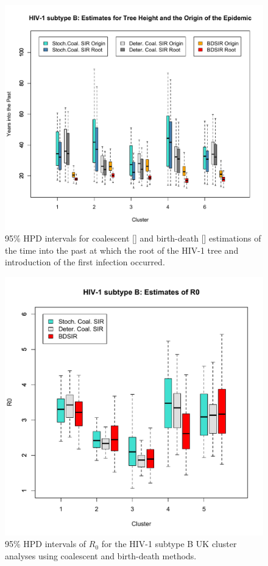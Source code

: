 \documentclass[12pt,titlepage]{article}
\begin{document}
%
\begin{figure}[!ht]
\begin{center}
\includegraphics[width=7in]{HIV1subtypeB_treeHeight_Origin.pdf}
\end{center}
\caption{
95\% HPD intervals for coalescent [\protect\cite{Volz:2012}] and birth-death [\protect\cite{Kuhnert:2014}]
estimations of the time into the past at which the root of the HIV-1 tree and introduction 
of the first infection occurred.}
\label{fig:HIV_HeightandOrigin}
\end{figure}
%
\begin{figure}[!ht]
\begin{center}
\includegraphics[width=7in]{HIV1subtypeB_R0.pdf}
\end{center}
\caption{
95\% HPD intervals of $R_0$ for the HIV-1 subtype B UK cluster 
analyses using coalescent and birth-death methods.}
\label{fig:HIV_R0}
\end{figure}
\end{document}

